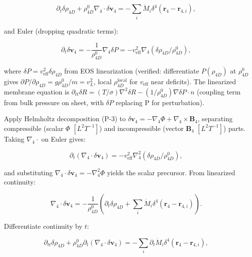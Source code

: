 \begin{equation}
\partial_t \delta \rho_{4D} + \rho_{4D}^0 \nabla_4 \cdot \delta \mathbf{v}_4 = -\sum_i \dot{M}_i \delta^4(\mathbf{r}_4 - \mathbf{r}_{4,i}),
\end{equation}

and Euler (dropping quadratic terms):

\begin{equation}
\partial_t \delta \mathbf{v}_4 = -\frac{1}{\rho_{4D}^0} \nabla_4 \delta P = -v_{\text{eff}}^2 \nabla_4 (\delta \rho_{4D} / \rho_{4D}^0),
\end{equation}

where $\delta P = v_{\text{eff}}^2 \delta \rho_{4D}$ from EOS linearization (verified: differentiate $P(\rho_{4D})$ at $\rho_{4D}^0$ gives $\partial P / \partial \rho_{4D} = g \rho_{4D}^0 / m = v_L^2$, local $\rho_{4D}^{\text{local}}$ for $v_{\text{eff}}$ near deficits). The linearized membrane equation is $\partial_{tt} \delta R = (T / \sigma) \nabla^2 \delta R - (1 / \rho_{4D}^0) \nabla \delta P \cdot n$ (coupling term from bulk pressure on sheet, with $\delta P$ replacing P for perturbation).

Apply Helmholtz decomposition (P-3) to $\delta \mathbf{v}_4 = -\nabla_4 \Phi + \nabla_4 \times \mathbf{B}_4$, separating compressible (scalar $\Phi$ $[L^2 T^{-1}]$) and incompressible (vector $\mathbf{B}_4$ $[L^2 T^{-1}]$) parts. Taking $\nabla_4 \cdot$ on Euler gives:

\begin{equation}
\partial_t (\nabla_4 \cdot \delta \mathbf{v}_4) = -v_{\text{eff}}^2 \nabla_4^2 (\delta \rho_{4D} / \rho_{4D}^0),
\end{equation}

and substituting $\nabla_4 \cdot \delta \mathbf{v}_4 = -\nabla_4^2 \Phi$ yields the scalar precursor. From linearized continuity:

\begin{equation}
\nabla_4 \cdot \delta \mathbf{v}_4 = -\frac{1}{\rho_{4D}^0} \left( \partial_t \delta \rho_{4D} + \sum_i \dot{M}_i \delta^4(\mathbf{r}_4 - \mathbf{r}_{4,i}) \right).
\end{equation}

Differentiate continuity by $t$:

\begin{equation}
\partial_{tt} \delta \rho_{4D} + \rho_{4D}^0 \partial_t (\nabla_4 \cdot \delta \mathbf{v}_4) = -\sum_i \partial_t \dot{M}_i \delta^4(\mathbf{r}_4 - \mathbf{r}_{4,i}),
\end{equation}

